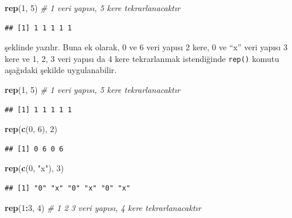 \documentclass[
]{book}
\newenvironment{Shaded}{\begin{snugshade}}{\end{snugshade}}
\newcommand{\CommentTok}[1]{\textcolor[rgb]{0.56,0.35,0.01}{\textit{#1}}}
\newcommand{\DecValTok}[1]{\textcolor[rgb]{0.00,0.00,0.81}{#1}}
\newcommand{\FunctionTok}[1]{\textcolor[rgb]{0.13,0.29,0.53}{\textbf{#1}}}
\newcommand{\NormalTok}[1]{#1}
\newcommand{\SpecialCharTok}[1]{\textcolor[rgb]{0.81,0.36,0.00}{\textbf{#1}}}
\newcommand{\StringTok}[1]{\textcolor[rgb]{0.31,0.60,0.02}{#1}}
\begin{document}
\begin{Shaded}
\begin{Highlighting}[]
\FunctionTok{rep}\NormalTok{(}\DecValTok{1}\NormalTok{, }\DecValTok{5}\NormalTok{)       }\CommentTok{\# 1 veri yapısı, 5 kere tekrarlanacaktır}
\end{Highlighting}
\end{Shaded}

\begin{verbatim}
## [1] 1 1 1 1 1
\end{verbatim}

şeklinde yazılır. Buna ek olarak, 0 ve 6 veri yapısı 2 kere, 0 ve ``x'' veri yapısı 3 kere ve 1, 2, 3 veri yapısı da 4 kere tekrarlanmak istendiğinde \texttt{rep()} komutu aşağıdaki şekilde uygulanabilir.

\begin{Shaded}
\begin{Highlighting}[]
\FunctionTok{rep}\NormalTok{(}\DecValTok{1}\NormalTok{, }\DecValTok{5}\NormalTok{)       }\CommentTok{\# 1 veri yapısı, 5 kere tekrarlanacaktır}
\end{Highlighting}
\end{Shaded}

\begin{verbatim}
## [1] 1 1 1 1 1
\end{verbatim}

\begin{Shaded}
\begin{Highlighting}[]
\FunctionTok{rep}\NormalTok{(}\FunctionTok{c}\NormalTok{(}\DecValTok{0}\NormalTok{, }\DecValTok{6}\NormalTok{), }\DecValTok{2}\NormalTok{)}
\end{Highlighting}
\end{Shaded}

\begin{verbatim}
## [1] 0 6 0 6
\end{verbatim}

\begin{Shaded}
\begin{Highlighting}[]
\FunctionTok{rep}\NormalTok{(}\FunctionTok{c}\NormalTok{(}\DecValTok{0}\NormalTok{, }\StringTok{"x"}\NormalTok{), }\DecValTok{3}\NormalTok{)}
\end{Highlighting}
\end{Shaded}

\begin{verbatim}
## [1] "0" "x" "0" "x" "0" "x"
\end{verbatim}

\begin{Shaded}
\begin{Highlighting}[]
\FunctionTok{rep}\NormalTok{(}\DecValTok{1}\SpecialCharTok{:}\DecValTok{3}\NormalTok{, }\DecValTok{4}\NormalTok{)     }\CommentTok{\# 1 2 3 veri yapısı, 4 kere tekrarlanacaktır }
\end{Highlighting}
\end{Shaded}
\end{document}

